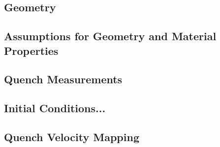 \documentclass{article}
\begin{document}
\subsection{Geometry}


\subsection{Assumptions for Geometry and Material Properties}


\subsection{Quench Measurements}


\subsection{Initial Conditions...}


\subsection{Quench Velocity Mapping}

\end{document}
